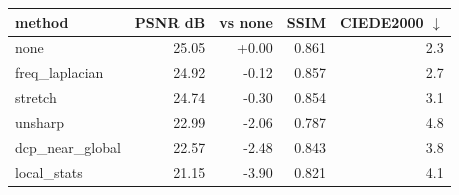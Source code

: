 \begin{tabular}{lrrrr}
\toprule
method & PSNR dB & vs none & SSIM & CIEDE2000 $\downarrow$ \\
\midrule
none & 25.05 & +0.00 & 0.861 & 2.3 \\
freq\_laplacian & 24.92 & -0.12 & 0.857 & 2.7 \\
stretch & 24.74 & -0.30 & 0.854 & 3.1 \\
unsharp & 22.99 & -2.06 & 0.787 & 4.8 \\
dcp\_near\_global & 22.57 & -2.48 & 0.843 & 3.8 \\
local\_stats & 21.15 & -3.90 & 0.821 & 4.1 \\
\bottomrule
\end{tabular}
